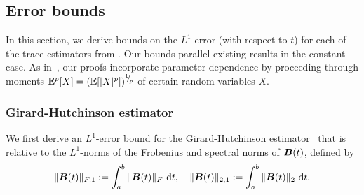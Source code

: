 %



\subsection{Error bounds}

In this section, we derive bounds on the $L^1$-error (with respect to $t$) for each of the trace estimators from . Our bounds parallel existing results in the constant case. As in~\cite{kressner-2024-randomized-lowrank}, our proofs incorporate parameter dependence by proceeding through moments $\mathbb{E}^p[X] = (\mathbb{E}[|X|^p])^{{}^{1}{\mskip -5mu/\mskip -3mu}_{p}}$ of certain random variables $X$.

\subsubsection{Girard-Hutchinson estimator}
\label{subsec:hutchinson}

We first derive an $L^1$-error bound for the Girard-Hutchinson estimator~ that is relative to the $L^1$-norms of the Frobenius and spectral norms of $\boldsymbol{B}(t)$, defined by
\begin{equation*}
 \|\boldsymbol{B}(t)\|_{F,1} := \int_{a}^{b} \|\boldsymbol{B}(t)\|_{F}~\mathrm{d}t, \quad  \|\boldsymbol{B}(t)\|_{2,1} := \int_{a}^{b} \|\boldsymbol{B}(t)\|_{2}~\mathrm{d}t.
\end{equation*}


